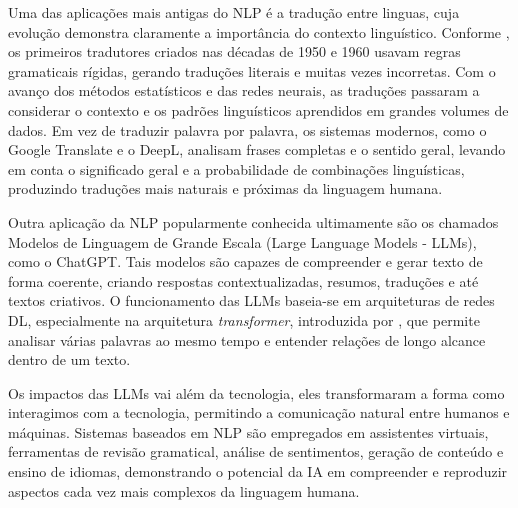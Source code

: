 Uma das aplicações mais antigas do NLP é a tradução entre linguas, cuja evolução demonstra claramente a importância do contexto linguístico. Conforme \textcite{hutchins2005history}, os primeiros tradutores criados nas décadas de 1950 e 1960 usavam regras gramaticais rígidas, gerando traduções literais e muitas vezes incorretas.
Com o avanço dos métodos estatísticos e das redes neurais, as traduções passaram a considerar o contexto e os padrões linguísticos aprendidos em grandes volumes de dados.
Em vez de traduzir palavra por palavra, os sistemas modernos, como o Google Translate e o DeepL, analisam frases completas e o sentido geral, levando em conta o significado geral e a probabilidade de combinações linguísticas, produzindo traduções mais naturais e próximas da linguagem humana.


Outra aplicação da NLP popularmente conhecida ultimamente são os chamados Modelos de Linguagem de Grande Escala (Large Language Models - LLMs), como o ChatGPT. Tais modelos são capazes de compreender e gerar texto de forma coerente, criando respostas contextualizadas, resumos, traduções e até textos criativos. O funcionamento das LLMs baseia-se em arquiteturas de redes DL, especialmente na arquitetura  \textit{transformer}, introduzida por \textcite{vaswani2017attention}, que permite analisar várias palavras ao mesmo tempo e entender relações de longo alcance dentro de um texto.

Os impactos das LLMs vai além da tecnologia, eles transformaram a forma como interagimos com a tecnologia, permitindo a comunicação natural entre humanos e máquinas. Sistemas baseados em NLP são empregados em assistentes virtuais, ferramentas de revisão gramatical, análise de sentimentos, geração de conteúdo e ensino de idiomas, demonstrando o potencial da IA em compreender e reproduzir aspectos cada vez mais complexos da linguagem humana.


